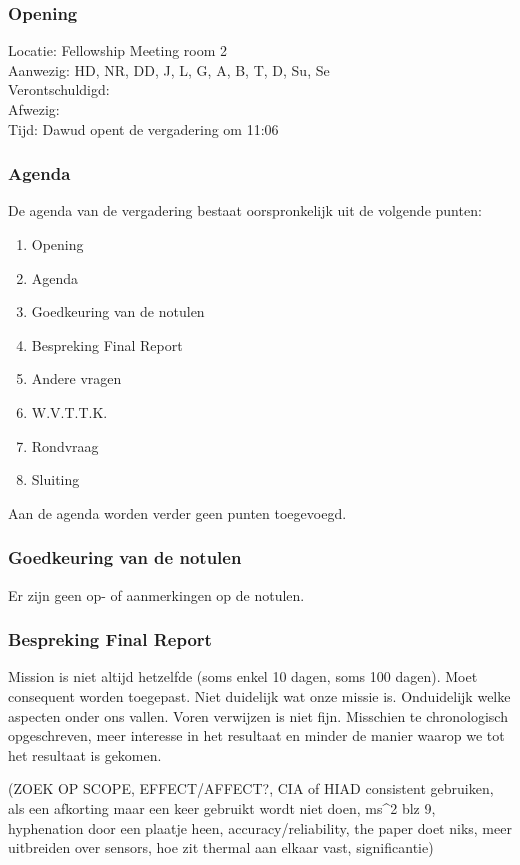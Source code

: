 \subsubsection{Opening}
Locatie: Fellowship Meeting room 2\\
Aanwezig: HD, NR, DD, J, L, G, A, B, T, D, Su, Se\\
Verontschuldigd: \\
Afwezig: \\
Tijd: Dawud opent de vergadering om 11:06\\

\subsubsection{Agenda}
De agenda van de vergadering bestaat oorspronkelijk uit de volgende punten:
\begin{enumerate}
\item Opening
\item Agenda
\item Goedkeuring van de notulen
\item Bespreking Final Report
\item Andere vragen
\item W.V.T.T.K.
\item Rondvraag
\item Sluiting
\end{enumerate}

Aan de agenda worden verder geen punten toegevoegd.

\subsubsection{Goedkeuring van de notulen}
Er zijn geen op- of aanmerkingen op de notulen.

\subsubsection{Bespreking Final Report}
Mission is niet altijd hetzelfde (soms enkel 10 dagen, soms 100 dagen). Moet consequent worden toegepast. Niet duidelijk wat onze missie is. Onduidelijk welke aspecten onder ons vallen. Voren verwijzen is niet fijn. Misschien te chronologisch opgeschreven, meer interesse in het resultaat en minder de manier waarop we tot het resultaat is gekomen. 

(ZOEK OP SCOPE, EFFECT/AFFECT?, CIA of HIAD consistent gebruiken, als een afkorting maar een keer gebruikt wordt niet doen, ms^2 blz 9, hyphenation door een plaatje heen, accuracy/reliability, the paper doet niks, meer uitbreiden over sensors, hoe zit thermal aan elkaar vast, significantie)

